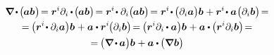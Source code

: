 \nopagebreak\vspace{-0.3em}\begin{multline}\label{divergenceofdyadicproducoftwovectors}
\boldnabla \hspace{-0.16ex} \dotp \hspace{-0.2ex} \bigl( \hspace{-0.1ex} \bm{a} \bm{b} \hspace{.05ex} \bigr) \hspace{-0.33ex}
= \locationvector^i \partial_i \hspace{-0.1ex} \dotp \hspace{-0.24ex} \bigl( \hspace{-0.1ex} \bm{a} \bm{b} \bigr) \hspace{-0.33ex}
= \locationvector^i \hspace{-0.3ex} \dotp \partial_i \bigl( \hspace{-0.1ex} \bm{a} \bm{b} \bigr) \hspace{-0.3ex}
= \locationvector^i \hspace{-0.3ex} \dotp \hspace{-0.15ex} \bigl( \partial_i \bm{a} \bigr) \bm{b} \hspace{.1ex} + \locationvector^i \hspace{-0.3ex} \dotp \bm{a} \hspace{.1ex} \bigl( \partial_i \bm{b} \bigr) \hspace{-0.33ex} =
\\[-0.1em]
%
= \hspace{-0.15ex} \bigl( \locationvector^i \hspace{-0.3ex} \dotp \partial_i \bm{a} \bigr) \bm{b} \hspace{.1ex} + \bm{a} \dotp \locationvector^i \hspace{-0.15ex} \bigl( \partial_i \bm{b} \bigr) \hspace{-0.33ex}
= \hspace{-0.15ex} \bigl( \locationvector^i \partial_i \hspace{-0.1ex} \dotp \bm{a} \bigr) \bm{b} \hspace{.1ex} + \bm{a} \dotp \hspace{-0.1ex} \bigl( \locationvector^i \partial_i \bm{b} \bigr) \hspace{-0.33ex} =
\\
%
= \hspace{-0.15ex} \bigl( \boldnabla \hspace{-0.15ex} \dotp \hspace{-0.1ex} \bm{a} \bigr) \bm{b} \hspace{.1ex} + \bm{a} \dotp \hspace{-0.12ex} \bigl( \boldnabla \hspace{.1ex} \bm{b} \bigr)
\end{multline}

